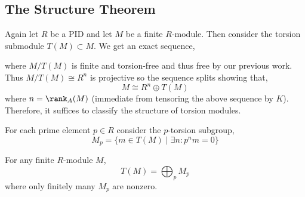 \documentclass[12pt]{article}
\begin{document}
\subsection{The Structure Theorem}

\begin{rmk}
Again let $R$ be a PID and let $M$ be a finite $R$-module. Then consider the torsion submodule $T(M) \subset M$. We get an exact sequence,
\begin{center}
\end{center}
where $M/T(M)$ is finite and torsion-free and thus free by our previous work. Thus $M/T(M) \cong R^n$ is projective so the sequence splits showing that,
\[ M \cong R^n \oplus T(M) \]
where $n = \rank_A(M)$ (immediate from tensoring the above sequence by $K$). Therefore, it suffices to classify the structure of torsion modules.
\end{rmk}

\begin{defn}
For each prime element $p \in R$ consider the $p$-torsion subgroup,
\[ M_p = \{ m \in T(M) \mid \exists n : p^n m = 0 \} \]
\end{defn}

\begin{prop}
For any finite $R$-module $M$,
\[ T(M) = \bigoplus_{p} M_p \]
where only finitely many $M_p$ are nonzero.
\end{prop}
\end{document}
